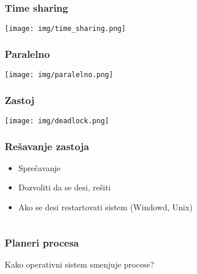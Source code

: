 \documentclass{beamer}
\begin{document}
\begin{frame}
    \frametitle{Time sharing}
    \begin{center}
        \texttt{[image: img/time\_sharing.png]}
    \end{center}
\end{frame}

\begin{frame}
    \frametitle{Paralelno}
    \begin{center}
        \texttt{[image: img/paralelno.png]}
    \end{center}
\end{frame}

\begin{frame}
    \frametitle{Zastoj}

    \begin{center}
        \texttt{[image: img/deadlock.png]}
    \end{center}
\end{frame}

\begin{frame}
    \frametitle{Rešavanje zastoja}
    \begin{itemize}
        \item Sprečavanje \newline
        \item Dozvoliti da se desi, rešiti \newline
        \item Ako se desi restartovati sistem (Windowd, Unix)
    \end{itemize}
\end{frame}

\section*{}
\subsection*{}
\begin{frame}
    \frametitle{Planeri procesa}
    \begin{center}
        \large{Kako operativni sistem smenjuje procese?}
    \end{center}
\end{frame}
\end{document}
